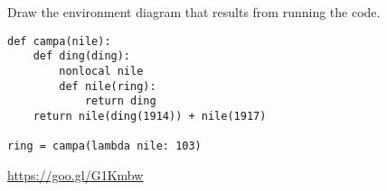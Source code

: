 \begin{blocksection}
\question Draw the environment diagram that results from running the code.

\begin{lstlisting}
def campa(nile):
    def ding(ding):
        nonlocal nile
        def nile(ring):
            return ding
    return nile(ding(1914)) + nile(1917)

ring = campa(lambda nile: 103)
\end{lstlisting}

\begin{solution}[1in]
\url{https://goo.gl/G1Kmbw}
\end{solution}
\end{blocksection}
